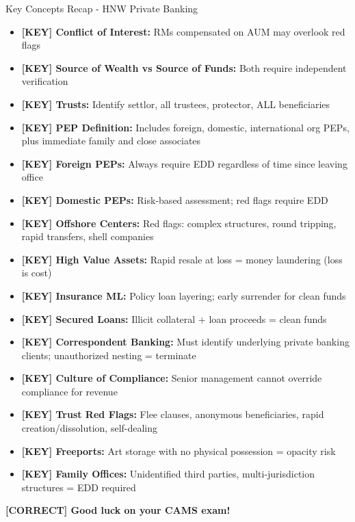 \documentclass[11pt,a4paper]{beamer}
\newcommand{\greennote}[1]{\textcolor{green!50!black}{\textbf{[CORRECT] #1}}}
\newcommand{\keyterm}[1]{\textcolor{red!80!black}{\textbf{[KEY] #1}}}
\begin{document}
	
	\begin{frame}{Key Concepts Recap - HNW Private Banking}
		\tiny
		\begin{itemize}
			\item \keyterm{Conflict of Interest:} RMs compensated on AUM may overlook red flags
			\item \keyterm{Source of Wealth vs Source of Funds:} Both require independent verification
			\item \keyterm{Trusts:} Identify settlor, all trustees, protector, ALL beneficiaries
			\item \keyterm{PEP Definition:} Includes foreign, domestic, international org PEPs, plus immediate family and close associates
			\item \keyterm{Foreign PEPs:} Always require EDD regardless of time since leaving office
			\item \keyterm{Domestic PEPs:} Risk-based assessment; red flags require EDD
			\item \keyterm{Offshore Centers:} Red flags: complex structures, round tripping, rapid transfers, shell companies
			\item \keyterm{High Value Assets:} Rapid resale at loss = money laundering (loss is cost)
			\item \keyterm{Insurance ML:} Policy loan layering; early surrender for clean funds
			\item \keyterm{Secured Loans:} Illicit collateral + loan proceeds = clean funds
			\item \keyterm{Correspondent Banking:} Must identify underlying private banking clients; unauthorized nesting = terminate
			\item \keyterm{Culture of Compliance:} Senior management cannot override compliance for revenue
			\item \keyterm{Trust Red Flags:} Flee clauses, anonymous beneficiaries, rapid creation/dissolution, self-dealing
			\item \keyterm{Freeports:} Art storage with no physical possession = opacity risk
			\item \keyterm{Family Offices:} Unidentified third parties, multi-jurisdiction structures = EDD required
		\end{itemize}
		\vspace{0.05cm}
		\centering
		\greennote{Good luck on your CAMS exam!}
	\end{frame}
	
\end{document}

